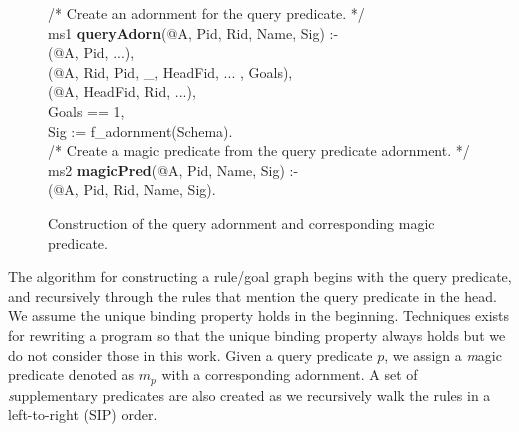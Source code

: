 \begin{figure}[!t]
\ssp
\centering
\begin{boxedminipage}{\linewidth}
/* Create an adornment for the query predicate. */ \\
ms1 {\bf queryAdorn}(@A, Pid, Rid, Name, Sig) :- \\
(@A, Pid, ...), \\
(@A, Rid, Pid, \_, HeadFid, ... , Goals), \\
(@A, HeadFid, Rid, ...), \\
\datalogspace Goals == 1, \\
\datalogspace Sig := f\_adornment(Schema). \\
	
/* Create a magic predicate from the query predicate adornment. */ \\
ms2 {\bf magicPred}(@A, Pid, Name, Sig) :- \\
(@A, Pid, Rid, Name, Sig). \\
\end{boxedminipage}
\caption{\label{ch:evita:fig:magicpred}Construction of the query adornment and corresponding magic predicate.}
\end{figure}

The algorithm for constructing a rule/goal graph begins with the query predicate, and
recursively through the rules that mention the query predicate in the head. We assume
the unique binding property holds in the beginning. Techniques exists for rewriting a program
so that the unique binding property always holds but we do not consider those in this work.
Given a query predicate $p$, we assign a {\emph magic predicate} denoted as $m_p$ with a corresponding 
adornment. A set of {\emph supplementary predicates} are also created as we recursively
walk the rules in a left-to-right (SIP) order. 


